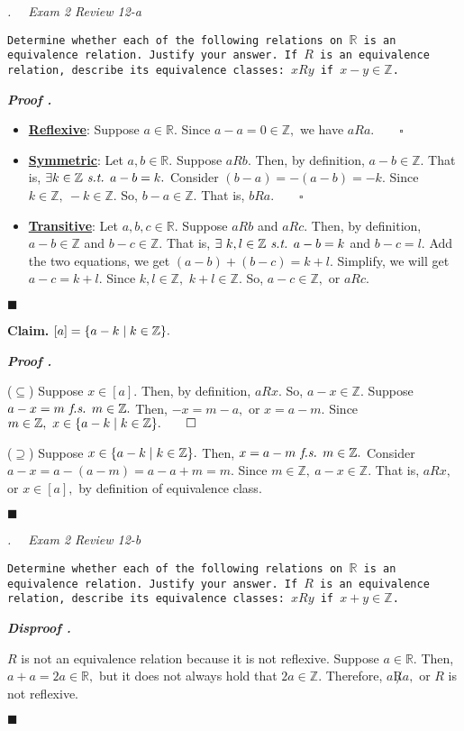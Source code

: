 \documentclass[11pt,letter]{article}
\newcounter{nq}[section]
\newcounter{np}[section]
\newenvironment*{p}{\par\noindent\textbf{\textit{Proof \stepcounter{np}\thenp. }}\par}{\par\hfill $\blacksquare$\par}
\newenvironment*{dis}{\par\noindent\textbf{\textit{Disproof \stepcounter{np}\thenp. }}\par}{\par\hfill $\blacksquare$\par}
\newenvironment*{q}[1]{\noindent\emph{\thesection.\stepcounter{nq}\thenq$\quad $ #1}\par\noindent\texttt}{}
\newenvironment*{clm}{\par\noindent\textbf{Claim. }}{\par}
\def\Z{{\mathbb{Z}}}
\def\R{{\mathbb{R}}}
\def\st{\emph{ s.t. }}
\def\fs{\emph{ f.s. }}
\begin{document}
\begin{framed}\begin{q}
	{Exam 2 Review 12-a}
	{Determine whether each of the following relations on $\R$ is an equivalence relation. Justify your answer. If $R$ is an equivalence relation, describe its equivalence classes: $xRy$ if $x-y\in\Z$.}
\end{q}\end{framed}
\begin{p}
	\begin{itemize}
		\item \underline{\textbf{Reflexive}}: Suppose $a\in\R.$ Since $a-a=0\in\Z,$ we have $aRa.\qquad\square$
		\item \underline{\textbf{Symmetric}}: Let $a,b\in\R.$ Suppose $aRb.$ Then, by definition, $a-b\in\Z.$ That is, $\exists k\in\Z\st a-b=k.$ Consider $(b-a)=-(a-b)=-k.$ Since $k\in\Z,\ -k\in\Z.$ So, $b-a\in\Z.$ That is, $bRa.\qquad\square$
		\item \underline{\textbf{Transitive}}: Let $a,b,c\in\R.$ Suppose $aRb$ and $aRc.$ Then, by definition, $a-b\in\Z$ and $b-c\in\Z.$ That is, $\exists\ k,l\in\Z\st a-b=k$ and $b-c=l.$ Add the two equations, we get $(a-b)+(b-c)=k+l.$ Simplify, we will get $a-c=k+l.$ Since $k,l\in\Z,$ $k+l\in\Z.$ So, $a-c\in\Z,$ or $aRc.$
	\end{itemize}
\end{p}
\begin{clm}
	$[a]=\qty{a-k\mid k\in\Z}.$
\end{clm}
\begin{p}
	($\subseteq$) Suppose $x\in[a].$ Then, by definition, $aRx.$ So, $a-x\in\Z.$ Suppose $a-x=m\fs m\in\Z.$ Then, $-x=m-a,$ or $x=a-m.$ Since $m\in\Z,\ x\in\qty{a-k\mid k\in\Z}.\qquad\square$\par 
	($\supseteq$) Suppose $x\in\qty{a-k\mid k\in\Z}.$ Then, $x=a-m\fs m\in\Z.$ Consider $a-x=a-(a-m)=a-a+m=m.$ Since $m\in\Z,\ a-x\in\Z.$ That is, $aRx,$ or $x\in[a],$ by definition of equivalence class. 
\end{p}

\begin{framed}\begin{q}
	{Exam 2 Review 12-b}
	{Determine whether each of the following relations on $\R$ is an equivalence relation. Justify your answer. If $R$ is an equivalence relation, describe its equivalence classes: $xRy$ if $x+y\in\Z$.}
\end{q}\end{framed}
\begin{dis}
	$R$ is not an equivalence relation because it is not reflexive. Suppose $a\in\R.$ Then, $a+a=2a\in\R,$ but it does not always hold that $2a\in\Z.$ Therefore, $a\not Ra,$ or $R$ is not reflexive. 
\end{dis}
\end{document}
